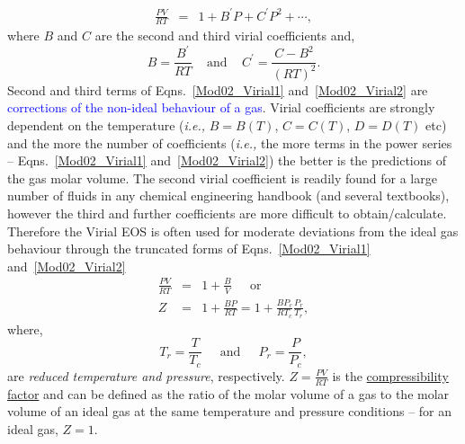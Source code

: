 \documentclass[12pts,a4paper,amsmath,amssymb,floatfix]{article}%
\newcommand{\frc}{\displaystyle\frac}
\newcommand{\blue}{\textcolor{blue}}
\newcommand{\ie}{{\it i.e., }}
\begin{document}
\begin{enumerate}[i)]
\begin{enumerate}[a)]
\begin{eqnarray}
                       \frc{P V}{R T} &=& 1 + B^{\prime}P + C^{\prime}P^{2} + \cdots,\label{Mod02_Virial2} 
                   \end{eqnarray}
                   where $B$ and $C$ are the second and third virial coefficients and,
                   \begin{displaymath}
                      B = \frc{B^{\prime}}{R T}\;\;\;\text{ and }\;\;\; C^{\prime}=\frc{C-B^{2}}{\left(R T\right)^{2}}.
                   \end{displaymath}
                   Second and third terms of Eqns.~\ref{Mod02_Virial1} and~\ref{Mod02_Virial2} are \blue{corrections of the non-ideal behaviour of a gas}. Virial coefficients are strongly dependent on the temperature (\ie $B=B(T)$, $C=C(T)$, $D=D(T)$ etc) and the more the number of coefficients (\ie the more terms in the power series -- Eqns.~\ref{Mod02_Virial1} and~\ref{Mod02_Virial2}) the better is the predictions of the gas molar volume. The second virial coefficient is readily found for a large number of fluids in any chemical engineering handbook (and several textbooks), however the third and further coefficients are more difficult to obtain/calculate. Therefore the Virial EOS is often used for moderate deviations from the ideal gas behaviour through the truncated forms of Eqns.~\ref{Mod02_Virial1} and~\ref{Mod02_Virial2}
                   \begin{eqnarray}
                      \frc{P V}{R T} &=& 1 + \frc{B}{V} \;\;\;\;\text{ or } \label{Mod02_Virial1b}\\
                      Z &=& 1 + \frc{B P}{R T} = 1 + \frc{B P_{c}}{R T_{c}}\frc{P_{r}}{T_{r}},\label{Mod02_Virial1c}
                   \end{eqnarray}
                   where,
                   \begin{equation}
                      T_{r} = \frc{T}{T_{c}}\;\;\;\;\text{ and }\;\;\;\; P_{r} = \frc{P}{P_{c}}\label{Mod02_ReducedT-P},
                   \end{equation}
                   are {\it reduced temperature and pressure}, respectively. $Z = \frac{P V}{R T}$ is the \underline{compressibility factor} and can be defined as the ratio of the molar volume of a gas to the molar volume of an ideal gas at the same temperature and pressure conditions -- for an ideal gas, $Z=1$. 


\end{enumerate}
\end{enumerate}
\end{document}
